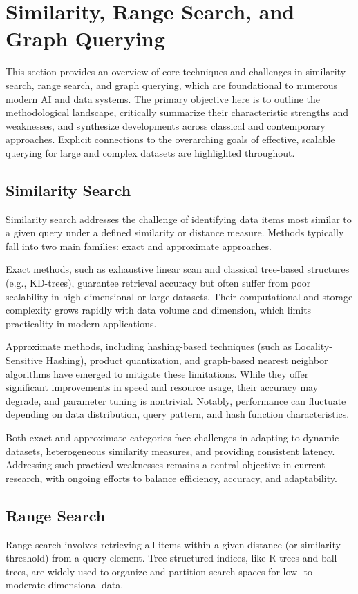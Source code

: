 \documentclass[sigconf]{acmart}
\begin{document}
\section{Similarity, Range Search, and Graph Querying}

This section provides an overview of core techniques and challenges in similarity search, range search, and graph querying, which are foundational to numerous modern AI and data systems. The primary objective here is to outline the methodological landscape, critically summarize their characteristic strengths and weaknesses, and synthesize developments across classical and contemporary approaches. Explicit connections to the overarching goals of effective, scalable querying for large and complex datasets are highlighted throughout.

\subsection{Similarity Search}
Similarity search addresses the challenge of identifying data items most similar to a given query under a defined similarity or distance measure. Methods typically fall into two main families: exact and approximate approaches.

Exact methods, such as exhaustive linear scan and classical tree-based structures (e.g., KD-trees), guarantee retrieval accuracy but often suffer from poor scalability in high-dimensional or large datasets. Their computational and storage complexity grows rapidly with data volume and dimension, which limits practicality in modern applications.

Approximate methods, including hashing-based techniques (such as Locality-Sensitive Hashing), product quantization, and graph-based nearest neighbor algorithms have emerged to mitigate these limitations. While they offer significant improvements in speed and resource usage, their accuracy may degrade, and parameter tuning is nontrivial. Notably, performance can fluctuate depending on data distribution, query pattern, and hash function characteristics.

Both exact and approximate categories face challenges in adapting to dynamic datasets, heterogeneous similarity measures, and providing consistent latency. Addressing such practical weaknesses remains a central objective in current research, with ongoing efforts to balance efficiency, accuracy, and adaptability.

\subsection{Range Search}
Range search involves retrieving all items within a given distance (or similarity threshold) from a query element. Tree-structured indices, like R-trees and ball trees, are widely used to organize and partition search spaces for low- to moderate-dimensional data.
\end{document}
